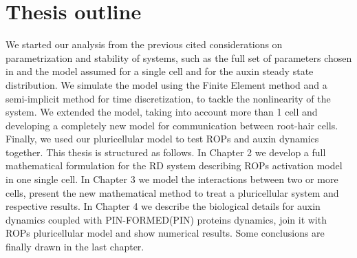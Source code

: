 \section{Thesis outline}
We started our analysis from the previous cited considerations on parametrization and stability of systems, such as the full set of parameters chosen in \cite{phdthesis:victor} and the model assumed for a single cell and for the auxin steady state distribution. We simulate the model using the Finite Element method and a semi-implicit method for time discretization, to tackle the nonlinearity of the system. We extended the model, taking into account more than 1 cell and developing a completely new model for communication between root-hair cells. Finally, we used our pluricellular model to test ROPs and auxin dynamics together.
This thesis is structured as follows. In Chapter 2 we develop a full mathematical formulation for the RD system describing ROPs activation model in one single cell. In Chapter 3 we model the interactions between two or more cells, present the new mathematical method to treat a pluricellular system and respective results. In Chapter 4 we describe the biological details for auxin dynamics coupled with PIN-FORMED(PIN) proteins dynamics, join it with ROPs pluricellular model and show numerical results. Some conclusions are finally drawn in the last chapter.

